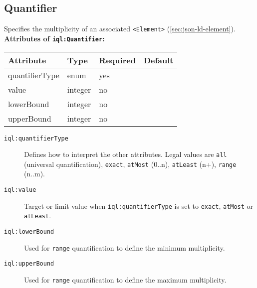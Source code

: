 \documentclass[11pt,a4paper,portrait]{article}
\newcommand{\iqlns}{iql:}
\newcommand{\iqlType}[1]{\texttt{\iqlns#1}}
\newcommand{\iqlBaseType}[1]{\texttt{\textless#1\textgreater}}
\newcommand{\desc}[1]{\noindent#1\newline\medskip}
\newenvironment{attributes}[1]{
\noindent\textbf{Attributes of #1:}\newline\medskip
\begin{tabular}{|p{0.3\textwidth}|p{0.20\textwidth}|p{0.20\textwidth}|p{0.17\textwidth}|}
	\hline
	\textbf{Attribute} & \textbf{Type} & \textbf{Required} & \textbf{Default} \\ 
	\hline
	\hline
}{
\end{tabular}
}
\newcommand{\attribute}[4]{
	#1 & #2 & #3 & #4 \\
	\hline
}
\begin{document}

\subsection{Quantifier}
\label{sec:json-ld-quantifier}
\desc{Specifies the multiplicity of an associated \iqlBaseType{Element} (\ref{sec:json-ld-element}).}
\begin{attributes}{\iqlType{Quantifier}}
	\attribute{quantifierType}{enum}{yes}{}
	\attribute{value}{integer}{no}{}
	\attribute{lowerBound}{integer}{no}{}
	\attribute{upperBound}{integer}{no}{}
\end{attributes}
\begin{description}
	\item[\iqlType{quantifierType}] Defines how to interpret the other attributes. Legal values are \texttt{all} (universal quantification), \texttt{exact}, \texttt{atMost} (0..n), \texttt{atLeast} (n+), \texttt{range} (n..m).
	\item[\iqlType{value}] Target or limit value when \iqlType{quantifierType} is set to \texttt{exact}, \texttt{atMost} or \texttt{atLeast}.
	\item[\iqlType{lowerBound}] Used for \texttt{range} quantification to define the minimum multiplicity.
	\item[\iqlType{upperBound}] Used for \texttt{range} quantification to define the maximum multiplicity.
\end{description}

\end{document}
